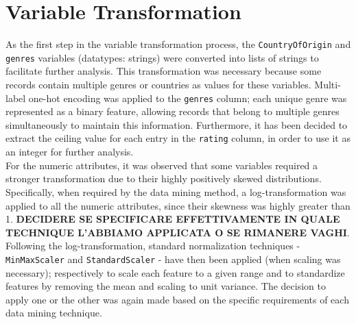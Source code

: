 \section{Variable Transformation}\label{sec:var_Transformation}
As the first step in the variable transformation process, the \texttt{CountryOfOrigin} and \texttt{genres} variables (datatypes: strings) were converted into lists of strings to facilitate further analysis. 
This transformation was necessary because some records contain multiple genres or countries as values for these variables.
Multi-label one-hot encoding was applied to the \texttt{genres} column; each unique genre was represented as a binary feature, allowing records that belong to multiple genres simultaneously to maintain this information.
Furthermore, it has been decided to extract the ceiling value for each entry in the \texttt{rating} column, in order to use it as an integer for further analysis.\\

For the numeric attributes, it was observed that some variables required a stronger transformation due to their highly positively skewed distributions. 
Specifically, when required by the data mining method, a log-transformation was applied to all the numeric attributes, since their skewness was highly greater than 1. 
\textbf{DECIDERE SE SPECIFICARE EFFETTIVAMENTE IN QUALE TECHNIQUE L'ABBIAMO APPLICATA O SE RIMANERE VAGHI}.
Following the log-transformation, standard normalization techniques - \texttt{MinMaxScaler} and \texttt{StandardScaler} - have then been applied (when scaling was necessary); respectively to scale each feature to a given range and to standardize features by removing the mean and scaling to unit variance.
The decision to apply one or the other was again made based on the specific requirements of each data mining technique.


